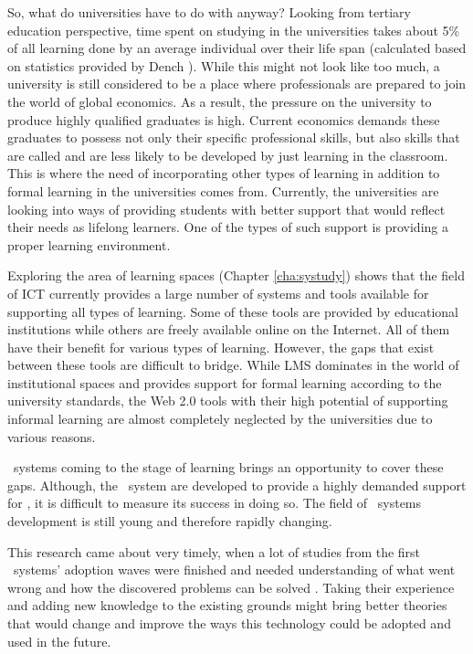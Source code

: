 So, what do universities have to do with \LLLs anyway? Looking from tertiary
education perspective, time spent on studying in the universities takes about
5\% of all learning done by an average individual over their life span
(calculated based on statistics provided by Dench
\citeyearpar[28-37]{Dench2010}). While this might not look like too much, a
university is still considered to be a place where professionals are prepared to
join the world of global economics. As a result, the pressure on the university
to produce highly qualified graduates is high. Current economics demands these
graduates to possess not only their specific professional skills, but also
skills that are called \LLLs and are less likely to be developed by just
learning in the classroom. This is where the need of incorporating other types
of learning in addition to formal learning in the universities comes from.
Currently, the universities are looking into ways of providing students with
better support that would reflect their needs as lifelong learners. One of the
types of such support is providing a proper learning environment.


Exploring the area of learning spaces (Chapter \ref{cha:systudy}) shows that
the field of ICT currently provides a large number of systems and tools
available for supporting all types of learning. Some of these tools are provided
by educational institutions while others are freely available online on the
Internet. All of them have their benefit for various types of learning. However,
the gaps that exist between these tools are difficult to bridge. While LMS
dominates in the world of institutional spaces and provides support for formal
learning according to the university standards, the Web 2.0 tools with their
high potential of supporting informal learning are almost completely neglected
by the universities due to various reasons.

\ep~systems coming to the stage of learning brings an opportunity to cover these
gaps. Although, the \ep~system are developed to provide a highly demanded
support for \LLLsn, it is difficult to measure its success in doing so. The
field of \ep~systems development is still young and therefore rapidly changing.

This research came about very timely, when a lot of studies from the first
\ep~systems' adoption waves were finished and needed understanding of what went
wrong and how the discovered problems can be solved \citep{Batson2010}. Taking
their experience and adding new knowledge to the existing grounds might bring
better theories that would change and improve the ways this technology could be
adopted and used in the future.

